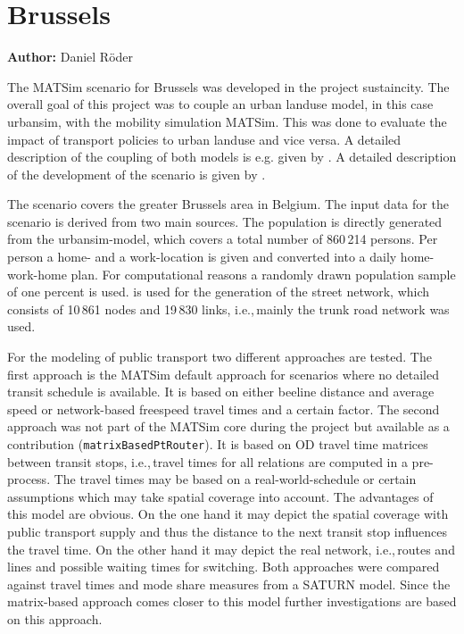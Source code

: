\section{Brussels}
\label{sec:brussels}
\hfill \textbf{Author:} Daniel Röder

The MATSim scenario for Brussels was developed in the project \acrshort{sustaincity}. The overall goal of this project was to couple an urban landuse model, in this case \acrshort{urbansim}, with the mobility simulation MATSim. This was done to evaluate the impact of transport policies to urban landuse and vice versa. A detailed description of the coupling of both models is e.g. given by \citet{Nicolai2013PhD}. A detailed description of the development of the scenario is given by \citet{RoederNagel2013SketchPlanningBrussels}.

The scenario covers the greater Brussels area in Belgium. The input data for the scenario is derived from two main sources. The population is directly generated from the \acrshort{urbansim}-model, which covers a total number of 860\,214 persons. Per person a home- and a work-location is given and converted into a daily home-work-home plan. For computational reasons a randomly drawn population sample of one percent is used. \citet{OpenStreetMap2014} is used for the generation of the street network, which consists of 10\,861 nodes and 19\,830 links, i.e.,\,mainly the trunk road network was used.

For the modeling of public transport two different approaches are tested. The first approach is the MATSim default approach for scenarios where no detailed transit schedule is available. It is based on either beeline distance and average speed or network-based freespeed travel times and a certain factor. The second approach was not part of the MATSim core during the project but available as a contribution (\lstinline|matrixBasedPtRouter|). It is based on OD travel time matrices between transit stops, i.e.,\,travel times for all relations are computed in a pre-process. The travel times may be based on a real-world-schedule or certain assumptions which may take spatial coverage into account. The advantages of this model are obvious. On the one hand it may depict the spatial coverage with public transport supply and thus the distance to the next transit stop influences the travel time. On the other hand it may depict the real network, i.e.,\,routes and lines and possible waiting times for switching. Both approaches were compared against travel times and mode share measures from a SATURN \citep{SATURN_Webpage_2014} model. Since the matrix-based approach comes closer to this model further investigations are based on this 
approach.

